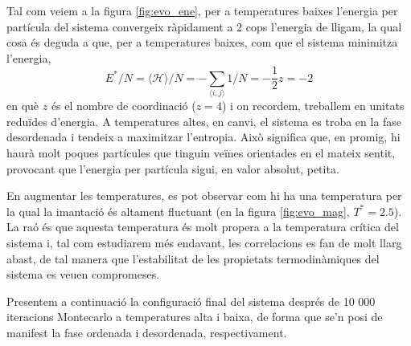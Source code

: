 \documentclass[a4paper]{article}
\begin{document}
Tal com veiem a la figura \ref{fig:evo_ene}, per a temperatures baixes l'energia per partícula del sistema convergeix ràpidament a 2 cops l'energia de lligam, la qual cosa és deguda a que, per a temperatures baixes, com que el sistema minimitza l'energia,
\begin{equation*}
    E^*/N = \langle \mathcal{H} \rangle / N= -\sum_{\langle{i,j\rangle}} 1/N = -\frac{1}{2}z = -2
\end{equation*}
en què $z$ és el nombre de coordinació ($z=4$) i on recordem, treballem en unitats reduïdes d'energia. A temperatures altes, en canvi, el sistema es troba en la fase desordenada i tendeix a maximitzar l'entropia. Això significa que, en promig, hi haurà molt poques partícules que tinguin veïnes orientades en el mateix sentit, provocant que l'energia per partícula sigui, en valor absolut, petita.


En augmentar les temperatures, es pot observar com hi ha una temperatura per la qual la imantació és altament fluctuant (en la figura \ref{fig:evo_mag}, $T^*=2.5$). La raó és que aquesta temperatura és molt propera a la temperatura crítica del sistema i, tal com estudiarem més endavant, les correlacions es fan de molt llarg abast, de tal manera que l'estabilitat de les propietats termodinàmiques del sistema es veuen compromeses.

Presentem a continuació la configuració final del sistema després de 10 000 iteracions Montecarlo a temperatures alta i baixa, de forma que se'n posi de manifest la fase ordenada i desordenada, respectivament.
\end{document}
